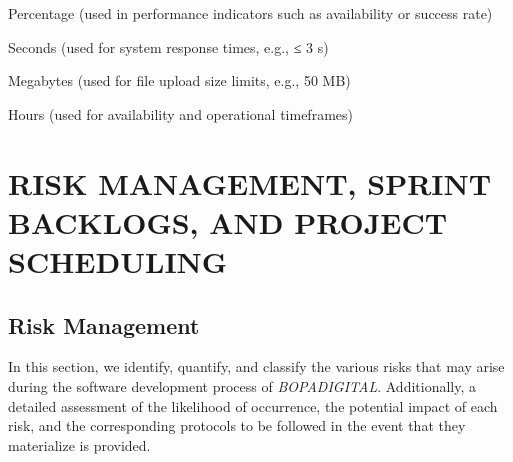 \documentclass[letterpaper%
, oneside%
, 12pt%
, memoireprojet%
, english%
,creativecommons,hyperref, withAlgo2e %
]{thETS}
\begin{document}
\begin{listofsymbols}[3cm]
\item [\%] Percentage (used in performance indicators such as availability or success rate)
\item [s] Seconds (used for system response times, e.g., ≤ 3 s)
\item [MB] Megabytes (used for file upload size limits, e.g., 50 MB)
\item [h] Hours (used for availability and operational timeframes)
\end{listofsymbols}



\cleardoublepage


\reversemarginpar





\chapter {RISK MANAGEMENT, SPRINT BACKLOGS, AND PROJECT SCHEDULING}

\section{Risk Management}
In this section, we identify, quantify, and classify the various risks that may arise during the software development process of \textit{BOPADIGITAL}. Additionally, a detailed assessment of the likelihood of occurrence, the potential impact of each risk, and the corresponding protocols to be followed in the event that they materialize is provided.
\end{document}
